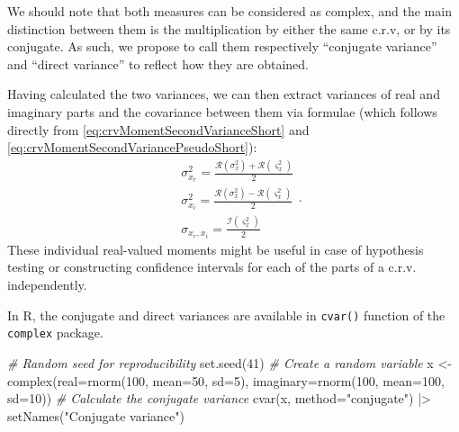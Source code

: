 \documentclass[
]{book}
\newenvironment{Shaded}{\begin{snugshade}}{\end{snugshade}}
\newcommand{\AttributeTok}[1]{\textcolor[rgb]{0.77,0.63,0.00}{#1}}
\newcommand{\CommentTok}[1]{\textcolor[rgb]{0.56,0.35,0.01}{\textit{#1}}}
\newcommand{\DecValTok}[1]{\textcolor[rgb]{0.00,0.00,0.81}{#1}}
\newcommand{\FunctionTok}[1]{\textcolor[rgb]{0.00,0.00,0.00}{#1}}
\newcommand{\NormalTok}[1]{#1}
\newcommand{\OtherTok}[1]{\textcolor[rgb]{0.56,0.35,0.01}{#1}}
\newcommand{\SpecialCharTok}[1]{\textcolor[rgb]{0.00,0.00,0.00}{#1}}
\newcommand{\StringTok}[1]{\textcolor[rgb]{0.31,0.60,0.02}{#1}}
\begin{document}
We should note that both measures can be considered as complex, and the main distinction between them is the multiplication by either the same c.r.v, or by its conjugate. As such, we propose to call them respectively ``conjugate variance'' and ``direct variance'' to reflect how they are obtained.

Having calculated the two variances, we can then extract variances of real and imaginary parts and the covariance between them via formulae (which follows directly from \eqref{eq:crvMomentSecondVarianceShort} and \eqref{eq:crvMomentSecondVariancePseudoShort}):
\begin{equation}
    \begin{aligned}
        & \sigma_{x_r}^2 = \frac{\mathcal{R}(\sigma^2_{\underline{x}}) + \mathcal{R}(\varsigma^2_{\underline{x}})}{2} \\
        & \sigma_{x_i}^2 = \frac{\mathcal{R}(\sigma^2_{\underline{x}}) - \mathcal{R}(\varsigma^2_{\underline{x}})}{2} \\
        & \sigma_{x_r,x_i} = \frac{\mathcal{I}(\varsigma^2_{\underline{x}})}{2}
    \end{aligned} .
    \label{eq:IndividualVariances}
\end{equation}
These individual real-valued moments might be useful in case of hypothesis testing or constructing confidence intervals for each of the parts of a c.r.v. independently.

In R, the conjugate and direct variances are available in \texttt{cvar()} function of the \texttt{complex} package.

\begin{Shaded}
\begin{Highlighting}[]
\CommentTok{\# Random seed for reproducibility}
\FunctionTok{set.seed}\NormalTok{(}\DecValTok{41}\NormalTok{)}
\CommentTok{\# Create a random variable}
\NormalTok{x }\OtherTok{\textless{}{-}} \FunctionTok{complex}\NormalTok{(}\AttributeTok{real=}\FunctionTok{rnorm}\NormalTok{(}\DecValTok{100}\NormalTok{, }\AttributeTok{mean=}\DecValTok{50}\NormalTok{, }\AttributeTok{sd=}\DecValTok{5}\NormalTok{),}
             \AttributeTok{imaginary=}\FunctionTok{rnorm}\NormalTok{(}\DecValTok{100}\NormalTok{, }\AttributeTok{mean=}\DecValTok{100}\NormalTok{, }\AttributeTok{sd=}\DecValTok{10}\NormalTok{))}
\CommentTok{\# Calculate the conjugate variance}
\FunctionTok{cvar}\NormalTok{(x, }\AttributeTok{method=}\StringTok{"conjugate"}\NormalTok{) }\SpecialCharTok{|\textgreater{}}
    \FunctionTok{setNames}\NormalTok{(}\StringTok{"Conjugate variance"}\NormalTok{)}
\end{Highlighting}
\end{Shaded}
\end{document}
